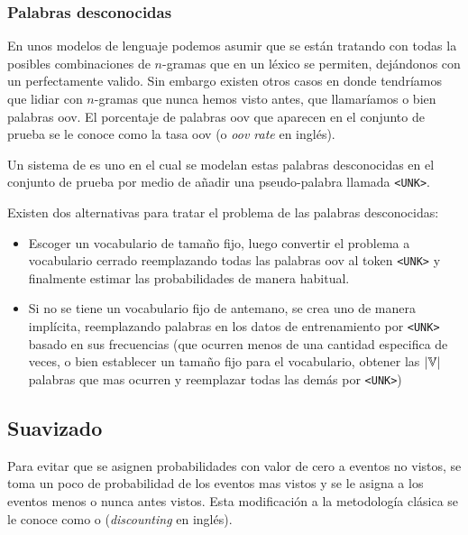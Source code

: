 \subsubsection{Palabras desconocidas}
En unos modelos de lenguaje podemos asumir que se están tratando con todas la posibles combinaciones de $n$-gramas que en un léxico se permiten, dejándonos con un  perfectamente valido. Sin embargo existen otros casos en donde tendríamos que lidiar con $n$-gramas que nunca hemos visto antes, que llamaríamos  o bien palabras \gls{oov}. El porcentaje de palabras \gls{oov} que aparecen en el conjunto de prueba se le conoce como la tasa \gls{oov} (o \textsl{\gls{oov} rate} en inglés).

Un sistema de  es uno en el cual se modelan estas palabras desconocidas en el conjunto de prueba por medio de añadir una pseudo-palabra llamada \texttt{<UNK>}.

Existen dos alternativas para tratar el problema de las palabras desconocidas:
\begin{itemize}
\item Escoger un vocabulario de tamaño fijo, luego convertir el problema a vocabulario cerrado reemplazando todas las palabras \gls{oov} al token \texttt{<UNK>} y finalmente estimar las probabilidades de manera habitual.
  
\item Si no se tiene un vocabulario fijo de antemano, se crea uno de manera implícita, reemplazando palabras en los datos de entrenamiento por \texttt{<UNK>} basado en sus frecuencias (que ocurren menos de una cantidad especifica de veces, o bien establecer un tamaño fijo para el vocabulario, obtener las $|{\mathbb{V}}|$ palabras que mas ocurren y reemplazar todas las demás por \texttt{<UNK>})
\end{itemize}


\subsection{Suavizado}
Para evitar que se asignen probabilidades con valor de cero a eventos no vistos, se toma un poco de probabilidad de los eventos mas vistos y se le asigna a los eventos menos o nunca antes vistos. Esta modificación a la metodología clásica se le conoce como  o  (\textsl{discounting} en inglés).

